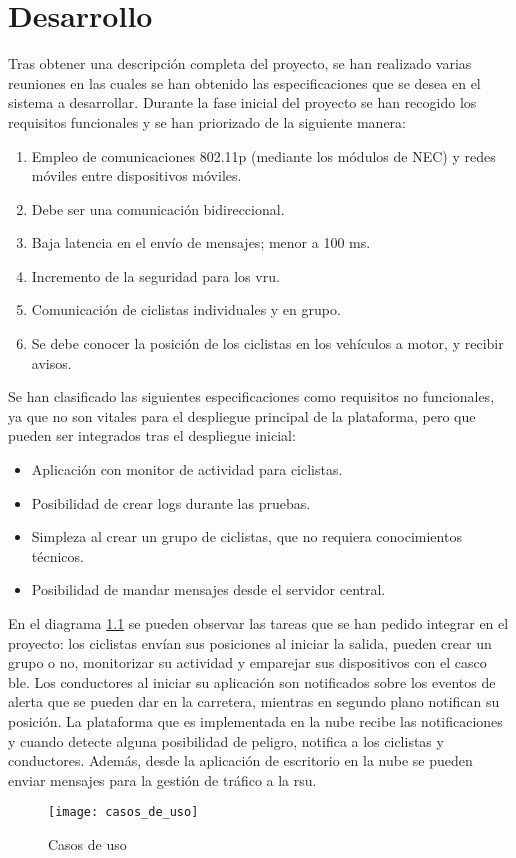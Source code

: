 \chapter{Desarrollo}\label{cha:desarrollo}
Tras obtener una descripción completa del proyecto, se han realizado varias reuniones en las cuales se han
obtenido las especificaciones que se desea en el sistema a desarrollar. Durante la fase inicial del proyecto
se han recogido los requisitos funcionales y se han priorizado de la siguiente manera:
\begin{enumerate}
	\item Empleo de comunicaciones \Gls{802.11p} (mediante los módulos de NEC) y redes móviles entre dispositivos móviles.
	\item Debe ser una comunicación bidireccional.
	\item Baja latencia en el envío de mensajes; menor a 100 ms.
	\item Incremento de la seguridad para los \gls{vru}.
	\item Comunicación de ciclistas individuales y en grupo.
	\item Se debe conocer la posición de los ciclistas en los vehículos a motor, y recibir avisos.
\end{enumerate}

Se han clasificado las siguientes especificaciones como requisitos no funcionales, ya que no son vitales
para el despliegue principal de la plataforma, pero que pueden ser integrados tras el despliegue inicial:
\begin{itemize}
	\item Aplicación con monitor de actividad para ciclistas.
	\item Posibilidad de crear logs durante las pruebas.
	\item Simpleza al crear un grupo de ciclistas, que no requiera conocimientos técnicos.
	\item Posibilidad de mandar mensajes desde el servidor central.
\end{itemize}

En el diagrama \ref{fig:casos_de_uso} se pueden observar las tareas que se han pedido integrar en el
proyecto: los ciclistas envían sus posiciones al iniciar la salida, pueden crear un grupo o no, monitorizar
su actividad y emparejar sus dispositivos con el casco \gls{ble}. Los conductores al iniciar su aplicación
son notificados sobre los eventos de alerta que se pueden dar en la carretera, mientras en segundo plano
notifican su posición. La plataforma que es implementada en la nube recibe las notificaciones y cuando
detecte alguna posibilidad de peligro, notifica a los ciclistas y conductores. Además, desde la aplicación
de escritorio en la nube se pueden enviar mensajes para la gestión de tráfico a la \gls{rsu}.
\begin{figure}[H]
	\begin{center}
		\texttt{[image: casos\_de\_uso]}
		\caption{Casos de uso}
		\label{fig:casos_de_uso}
	\end{center}
\end{figure}

